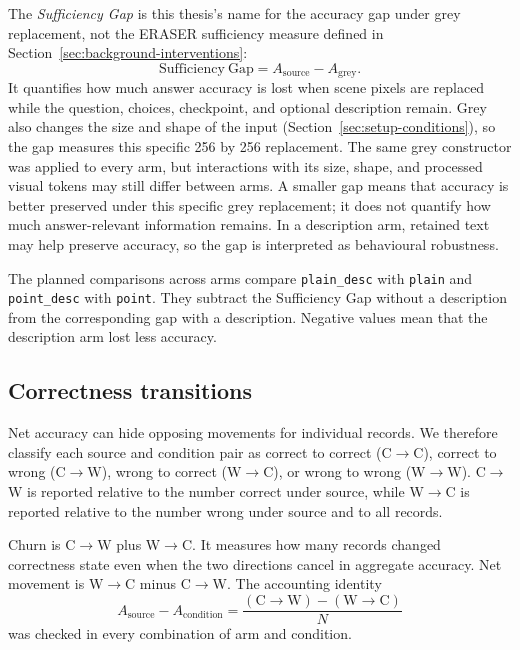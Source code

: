 The \emph{Sufficiency Gap} is this thesis's name for the accuracy gap under grey
replacement, not the ERASER sufficiency measure defined in
Section~\ref{sec:background-interventions}:
\[
  \mathrm{Sufficiency\ Gap}
  =A_{\mathrm{source}}-A_{\mathrm{grey}}.
\]
It quantifies how much answer accuracy is lost when scene pixels are replaced
while the question, choices, checkpoint, and optional description remain. Grey
also changes the size and shape of the input (Section~\ref{sec:setup-conditions}),
so the gap measures this specific 256 by 256 replacement. The same grey
constructor was applied to every arm, but interactions with its size, shape, and
processed visual tokens may still differ between arms. A smaller gap means that
accuracy is better preserved under this specific grey replacement; it does not
quantify how much answer-relevant information remains. In a description arm,
retained text may help preserve accuracy, so the gap is interpreted as
behavioural robustness.

The planned comparisons across arms compare \texttt{plain\_desc} with
\texttt{plain} and \texttt{point\_desc} with \texttt{point}. They subtract
the Sufficiency Gap without a description from the corresponding gap with a description.
Negative values mean that the description arm lost less accuracy.

\subsection{Correctness transitions}
\label{sec:framework-transitions}

Net accuracy can hide opposing movements for individual records. We therefore
classify each source and condition pair as correct to correct (C$\rightarrow$C),
correct to wrong (C$\rightarrow$W), wrong to correct (W$\rightarrow$C), or
wrong to wrong (W$\rightarrow$W). C$\rightarrow$W is reported relative to the
number correct under source, while W$\rightarrow$C is reported relative to the
number wrong under source and to all records.

Churn is C$\rightarrow$W plus W$\rightarrow$C. It measures how many records
changed correctness state even when the two directions cancel in aggregate
accuracy. Net movement is W$\rightarrow$C minus C$\rightarrow$W. The
accounting identity
\[
  A_{\mathrm{source}}-A_{\mathrm{condition}}
  =\frac{\left(\mathrm{C}\rightarrow\mathrm{W}\right)
         -\left(\mathrm{W}\rightarrow\mathrm{C}\right)}{N}
\]
was checked in every combination of arm and condition.

